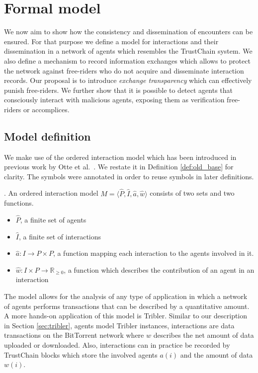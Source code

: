 \chapter{Formal model}
\label{chap:model}
We now aim to show how the consistency and dissemination of encounters can be ensured. 
For that purpose we define a model for interactions and their dissemination in a network of agents 
which resembles the TrustChain system. We also define a
mechanism to record information exchanges which allows to protect the network against free-riders who 
do not acquire and disseminate interaction records. Our proposal is to introduce \textit{exchange transparency} which can 
effectively punish free-riders. We further 
show that it is possible to detect agents that consciously interact with malicious agents, exposing
them as verification free-riders or accomplices.

\section{Model definition}
\label{sec:definitions}
We make use of the ordered interaction model which has been introduced in previous work by Otte et 
al.\ \cite{OTTE2017}. We restate it in Definition \ref{def:old_base} for clarity.
The symbols were annotated in order to reuse symbols in later definitions.

\begin{defn}. 
    \label{def:old_base}
    An ordered interaction model $\hat M = \langle \hat P, \hat I, \hat a, \hat w \rangle$ consists of two sets and two 
    functions.
    \begin{itemize}
        \item $\hat P$, a finite set of agents
        \item $\hat I$, a finite set of interactions
        \item $\hat a : I \rightarrow P \times P$, a function mapping each interaction to the agents 
        involved in it.
        \item $\hat w : I \times P \rightarrow \mathbb{R}_{\geq0}$, a function which describes the 
        contribution of an agent in an interaction
    \end{itemize}
\end{defn}

The model allows for the analysis of any type of application in which a network of agents performs
transactions that can be described by a quantitative amount. A more hands-on application of this 
model is Tribler. Similar to our description in Section \ref{sec:tribler}, agents model Tribler
instances, interactions are data transactions on the BitTorrent network where $w$ describes the 
net amount of data uploaded or downloaded. Also, interactions can in practice be recorded by 
TrustChain blocks which store the involved agents $a(i)$ and the amount of data $w(i)$.

